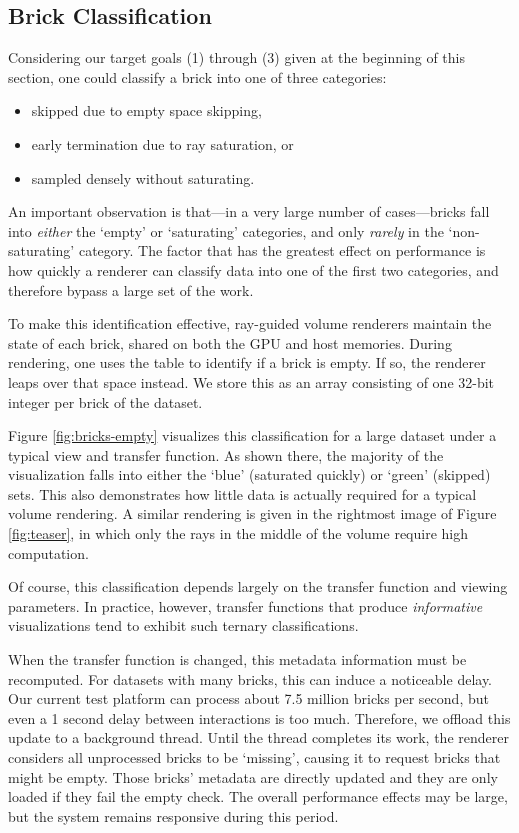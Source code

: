 \subsection{Brick Classification}
\label{sec:brick-classification}

Considering our target goals (1) through (3) given at the beginning of
this section, one could classify a brick into one of three categories:
\begin{itemize}
  \itemsep0em
  \item skipped due to empty space skipping,

  \item early termination due to ray saturation, or

  \item sampled densely without saturating.
\end{itemize}

An important observation is that---in a very large number of
cases---bricks fall into \emph{either} the `empty' or `saturating'
categories, and only \emph{rarely} in the `non-saturating' category.
The factor that has the greatest effect on performance is how quickly
a renderer can classify data into one of the first two categories, and
therefore bypass a large set of the work.

To make this identification effective, ray-guided volume renderers
maintain the state of each brick, shared on both the GPU and host
memories.  During rendering, one uses the table to identify if a brick
is empty.  If so, the renderer leaps over that space instead.  We store
this as an array consisting of one 32-bit integer per brick of the
dataset.

Figure \ref{fig:bricks-empty} visualizes this classification for a
large dataset under a typical view and transfer function.  As shown
there, the majority of the visualization falls into either the `blue'
(saturated quickly) or `green' (skipped) sets. This also demonstrates
how little data is actually required for a typical volume rendering.  A
similar rendering is given in the rightmost image of
Figure \ref{fig:teaser}, in which only the rays in the middle of the
volume require high computation.

Of course, this classification depends largely on the transfer function
and viewing parameters.  In practice, however, transfer functions that
produce \emph{informative} visualizations tend to exhibit such ternary
classifications.

When the transfer function is changed, this metadata information
must be recomputed.  For datasets with many bricks, this can induce
a noticeable delay.  Our current test platform can process about
7.5 million bricks per second, but even a 1 second delay between
interactions is too much.  Therefore, we offload this update to a
background thread.  Until the thread completes its work, the renderer
considers all unprocessed bricks to be `missing', causing it to request
bricks that might be empty.  Those bricks' metadata are directly
updated and they are only loaded if they fail the empty check.  The
overall performance effects may be large, but the system remains
responsive during this period.


